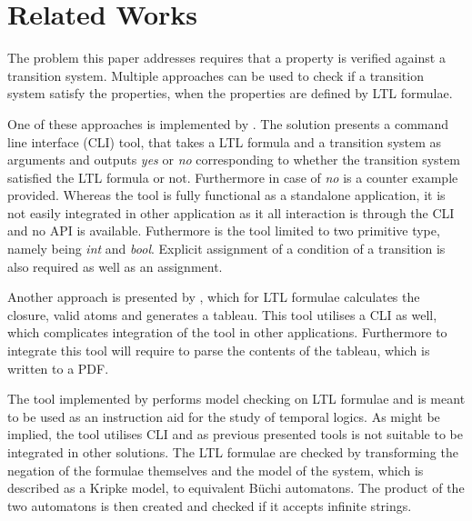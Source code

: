 \section{Related Works}
The problem this paper addresses requires that a property is verified against a transition system. Multiple approaches can be used to check if a transition system satisfy the properties, when the properties are defined by LTL formulae.

One of these approaches is implemented by \cite{serejke}. The solution presents a command line interface (CLI) tool, that takes a LTL formula and a transition system as arguments and outputs \textit{yes} or \textit{no} corresponding to whether the transition system satisfied the LTL formula or not. Furthermore in case of \textit{no} is a counter example provided. Whereas the tool is fully functional as a standalone application, it is not easily integrated in other application as it all interaction is through the CLI and no API is available. Futhermore is the tool limited to two primitive type, namely being \textit{int} and \textit{bool}. Explicit assignment of a condition of a transition is also required as well as an assignment.

Another approach is presented by \cite{erlkoenig90}, which for LTL formulae calculates the closure, valid atoms and generates a tableau. This tool utilises a CLI as well, which complicates integration of the tool in other applications. Furthermore to integrate this tool will require to parse the contents of the tableau, which is written to a PDF.

The tool implemented by \cite{jpsember} performs model checking on LTL formulae and is meant to be used as an instruction aid for the study of temporal logics. As might be implied, the tool utilises CLI and as previous presented tools is not suitable to be integrated in other solutions. The LTL formulae are checked by transforming the negation of the formulae themselves and the model of the system, which is described as a Kripke model, to equivalent Büchi automatons. The product of the two automatons is then created and checked if it accepts infinite strings.


